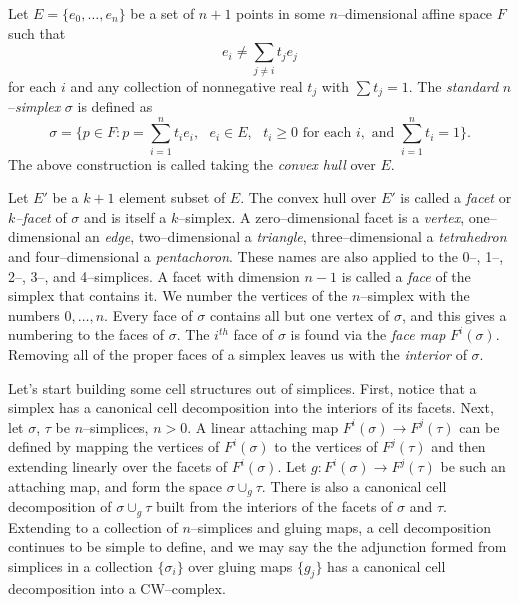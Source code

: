 \begin{defn}
	Let $E=\{e_0,\dots,e_n\}$ be a set of $n+1$ points in some $n$--dimensional affine space $F$ such that
	\[
	  e_i\neq \sum_{j\neq i}t_j e_j
	\]
	for each $i$ and any collection of nonnegative real $t_j$ with $\sum t_j=1$.
	The \emph{standard} $n$--\emph{simplex} $\sigma$ is defined as
	\[
	  \sigma = \{p\in F : p = \sum_{i=1}^n t_i e_i,\text{ } e_i\in E,\text{ } t_i\geq 0\text{ for each }i, \text{ and }\sum_{i=1}^n t_i=1\}.
	\]
	The above construction is called taking the \emph{convex hull} over $E$.
	
	Let $E'$ be a $k+1$ element subset of $E$.
	The convex hull over $E'$ is called a \emph{facet} or \emph{$k$--facet} of $\sigma$ and is itself a $k$--simplex.
	A zero--dimensional facet is a \emph{vertex}, one--dimensional an \emph{edge}, two--dimensional a \emph{triangle}, three--dimensional a \emph{tetrahedron} and four--dimensional a \emph{pentachoron}.
	These names are also applied to the 0--, 1--, 2--, 3--, and 4--simplices.
	A facet with dimension $n-1$ is called a \emph{face} of the simplex that contains it.
	We number the vertices of the $n$--simplex with the numbers $0,\dots,n$.
	Every face of $\sigma$ contains all but one vertex of $\sigma$, and this gives a numbering to the faces of $\sigma$.
	The $i^{th}$ face of $\sigma$ is found via the \emph{face map} $F^i(\sigma)$.
	Removing all of the proper faces of a simplex leaves us with the \emph{interior} of $\sigma$.
\end{defn}

Let's start building some cell structures out of simplices.
First, notice that a simplex has a canonical cell decomposition into the interiors of its facets.
Next, let $\sigma$, $\tau$ be $n$--simplices, $n>0$.
A linear attaching map $F^i(\sigma)\to F^j(\tau)$ can be defined by mapping the vertices of $F^i(\sigma)$ to the vertices of $F^j(\tau)$ and then extending linearly over the facets of $F^i(\sigma)$.
Let $g:F^i(\sigma)\to F^j(\tau)$ be such an attaching map, and form the space $\sigma\cup_g \tau$.
There is also a canonical cell decomposition of $\sigma\cup_g \tau$ built from the interiors of the facets of $\sigma$ and $\tau$.
Extending to a collection of $n$--simplices and gluing maps, a cell decomposition continues to be simple to define, and we may say the the adjunction formed from simplices in a collection $\{\sigma_i\}$ over gluing maps $\{g_j\}$ has a canonical cell decomposition into a CW--complex.


